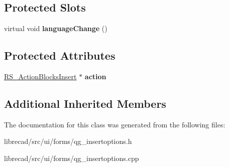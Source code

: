 \subsection*{Protected Slots}
\begin{DoxyCompactItemize}
\item 
\hypertarget{classQG__InsertOptions_a4e9fc294f4014f38004bd6d81cdd33c0}{virtual void {\bfseries language\-Change} ()}\label{classQG__InsertOptions_a4e9fc294f4014f38004bd6d81cdd33c0}

\end{DoxyCompactItemize}
\subsection*{Protected Attributes}
\begin{DoxyCompactItemize}
\item 
\hypertarget{classQG__InsertOptions_a520ba98bbf3b53eef18011e6d8527926}{\hyperlink{classRS__ActionBlocksInsert}{R\-S\-\_\-\-Action\-Blocks\-Insert} $\ast$ {\bfseries action}}\label{classQG__InsertOptions_a520ba98bbf3b53eef18011e6d8527926}

\end{DoxyCompactItemize}
\subsection*{Additional Inherited Members}


The documentation for this class was generated from the following files\-:\begin{DoxyCompactItemize}
\item 
librecad/src/ui/forms/qg\-\_\-insertoptions.\-h\item 
librecad/src/ui/forms/qg\-\_\-insertoptions.\-cpp\end{DoxyCompactItemize}
